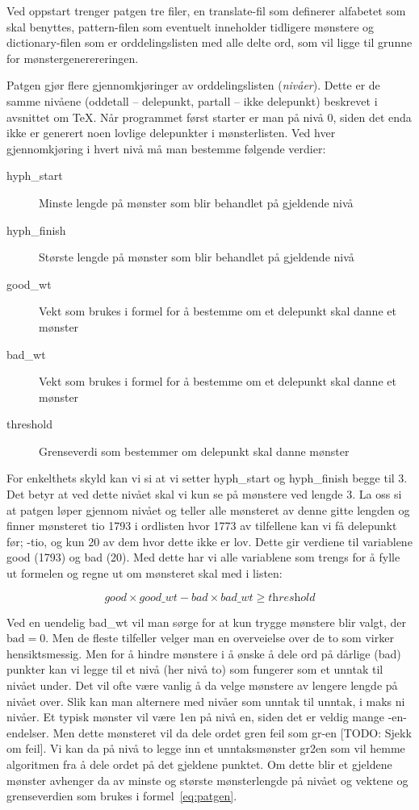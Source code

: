 Ved oppstart trenger patgen tre filer, en translate-fil som definerer alfabetet som skal benyttes, pattern-filen som eventuelt inneholder tidligere mønstere og dictionary-filen som er orddelingslisten med alle delte ord, som vil ligge til grunne for mønstergenerereringen. 

Patgen gjør flere gjennomkjøringer av orddelingslisten (\textit{nivåer}). Dette er de samme nivåene (oddetall -- delepunkt, partall -- ikke delepunkt) beskrevet i avsnittet om \TeX{}. Når programmet først starter er man på nivå 0, siden det enda ikke er generert noen lovlige delepunkter i mønsterlisten. Ved hver gjennomkjøring i hvert nivå må man bestemme følgende verdier:

\begin{description}
\item[hyph\_start] Minste lengde på mønster som blir behandlet på gjeldende nivå
\item[hyph\_finish] Største lengde på mønster som blir behandlet på gjeldende nivå
\item[good\_wt] Vekt som brukes i formel for å bestemme om et delepunkt skal danne et mønster
\item[bad\_wt] Vekt som brukes i formel for å bestemme om et delepunkt skal danne et mønster
\item[threshold] Grenseverdi som bestemmer om delepunkt skal danne mønster
\end{description}

For enkelthets skyld kan vi si at vi setter hyph\_start og hyph\_finish begge til 3. Det betyr at ved dette nivået skal vi kun se på mønstere ved lengde 3. La oss si at patgen løper gjennom nivået og teller alle mønsteret av denne gitte lengden og finner mønsteret tio 1793 i ordlisten hvor 1773 av tilfellene kan vi få delepunkt før; -tio, og kun 20 av dem hvor dette ikke er lov. Dette gir verdiene til variablene good (1793) og bad (20). Med dette har vi alle variablene som trengs for å fylle ut formelen og regne ut om mønsteret skal med i listen:

\begin{equation}
\label{eq:patgen}
\textit{good} \times \textit{good\_wt} - \textit{bad} \times \textit{bad\_wt} \geq \textit{threshold}
\end{equation}

Ved en uendelig bad\_wt vil man sørge for at kun trygge mønstere blir valgt, der $\text{bad} = 0$. Men de fleste tilfeller velger man en overveielse over de to som virker hensiktsmessig. Men for å hindre mønstere i å ønske å dele ord på dårlige (bad) punkter kan vi legge til et nivå (her nivå to) som fungerer som et unntak til nivået under. Det vil ofte være vanlig å da velge mønstere av lengere lengde på nivået over. Slik kan man alternere med nivåer som unntak til unntak, i maks ni nivåer. Et typisk mønster vil være 1en på nivå en, siden det er veldig mange -en-endelser. Men dette mønsteret vil da dele ordet gren feil som gr-en [TODO: Sjekk om feil]. Vi kan da på nivå to legge inn et unntaksmønster gr2en som vil hemme algoritmen fra å dele ordet på det gjeldene punktet. Om dette blir et gjeldene mønster avhenger da av minste og største mønsterlengde på nivået og vektene og grenseverdien som brukes i formel~\ref{eq:patgen}. 

